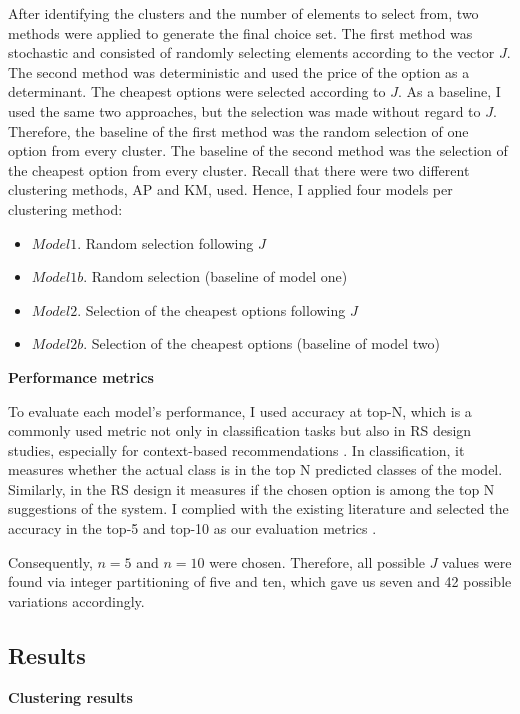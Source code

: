 \documentclass[a4paper,12pt]{article}
\begin{document}
After identifying the clusters and the number of elements to select from, two methods were applied to generate the final choice set. The first method was stochastic and consisted of randomly selecting elements according to the vector $J$. The second method was deterministic and used the price of the option as a determinant. The cheapest options were selected according to $J$. As a baseline, I used the same two approaches, but the selection was made without regard to $J$. Therefore, the baseline of the first method was the random selection of one option from every cluster. The baseline of the second method was the selection of the cheapest option from every cluster. Recall that there were two different clustering methods, AP and KM, used. Hence, I applied four models per clustering method:

\begin{itemize}
    \item $Model 1$. Random selection following $J$
    \item $Model 1b$. Random selection (baseline of model one)
    \item $Model 2$. Selection of the cheapest options following $J$
    \item $Model 2b$. Selection of the cheapest options (baseline of model two)
\end{itemize}

\textbf{Performance metrics}

To evaluate each model's performance, I used accuracy at top-N, which is a commonly used metric not only in classification tasks but also in RS design studies, especially for context-based recommendations \citep{ricci2010recsystems}. In classification, it measures whether the actual class is in the top N predicted classes of the model. Similarly, in the RS design it measures if the chosen option is among the top N suggestions of the system. I complied with the existing literature and selected the accuracy in the top-5 and top-10 as our evaluation metrics \cite{cremonesi2010performance}. 

Consequently, $n = 5$ and $n = 10$ were chosen. Therefore, all possible $J$ values were found via integer partitioning of five and ten, which gave us seven and 42 possible variations accordingly.

\subsection{Results}

\textbf{Clustering results}
    
\end{document}
